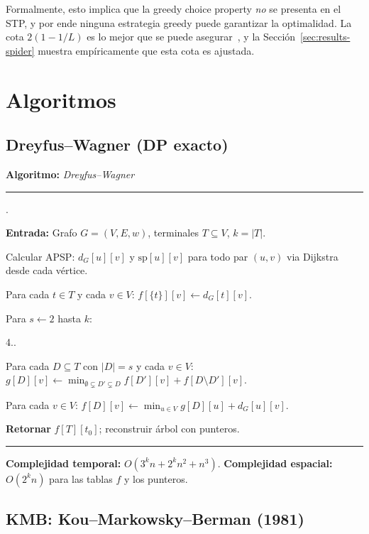 \documentclass[11pt]{article}
\newcounter{pcstep}
\newcounter{innerpc}
\newenvironment{pseudocode}[1]{%
  \medskip
  \noindent\textbf{Algoritmo:} \textit{#1}\\
  \noindent\rule{\linewidth}{0.4pt}
  \begin{list}{\arabic{pcstep}.}{\usecounter{pcstep}%
    \setlength{\leftmargin}{2em}\setlength{\itemsep}{2pt}}
}{%
  \end{list}
  \noindent\rule{\linewidth}{0.4pt}
  \medskip
}
\begin{document}
Formalmente, esto implica que la greedy choice property \emph{no} se presenta
en el STP, y por ende ninguna estrategia greedy puede garantizar la optimalidad.
La cota $2(1-1/L)$ es lo mejor que se puede asegurar~\cite{KouMarkowskyBerman1981},
y la Secci\'on~\ref{sec:results-spider} muestra emp\'iricamente que esta cota es ajustada.

\section{Algoritmos}\label{sec:algorithms}

\subsection{Dreyfus--Wagner (DP exacto)}

\begin{pseudocode}{Dreyfus--Wagner}
  \item \textbf{Entrada:} Grafo $G=(V,E,w)$, terminales $T\subseteq V$, $k=|T|$.
  \item Calcular APSP: $d_G[u][v]$ y $\mathrm{sp}[u][v]$ para todo par
        $(u,v)$ via Dijkstra desde cada v\'ertice.
  \item Para cada $t\in T$ y cada $v\in V$: $f[\{t\}][v] \gets d_G[t][v]$.
  \item Para $s\gets 2$ hasta $k$:
    \begin{list}{4..}{%
      \setlength{\leftmargin}{3em}\setlength{\itemsep}{1pt}}
      \item Para cada $D\subseteq T$ con $|D|=s$ y cada $v\in V$:
        $g[D][v] \gets \min_{\emptyset\subsetneq D'\subsetneq D}
        f[D'][v]+f[D\setminus D'][v]$.
      \item Para cada $v\in V$:
        $f[D][v] \gets \min_{u\in V} g[D][u]+d_G[u][v]$.
    \end{list}
  \item \textbf{Retornar} $f[T][t_0]$; reconstruir \'arbol con punteros.
\end{pseudocode}

\textbf{Complejidad temporal:} $O(3^k n + 2^k n^2 + n^3)$.
\textbf{Complejidad espacial:} $O(2^k n)$ para las tablas $f$ y los punteros.

\subsection{KMB: Kou--Markowsky--Berman (1981)}
\end{document}
